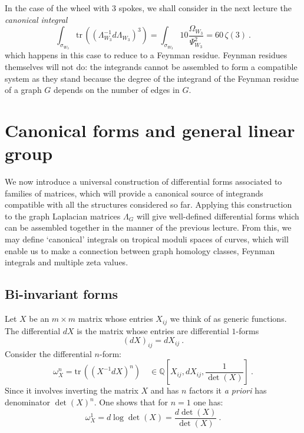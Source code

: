 \documentclass[12pt]{amsart}
\newcommand{\QQ}{{\mathbb Q}}
\newcommand{\tr}{\mathrm{tr}\,}
\theoremstyle{plain}
\newcommand{\0}{\color{blue}{\mathsf{0}}}
\begin{document}
In the case of the wheel with 3 spokes, we shall consider in the next lecture  the \emph{canonical integral}
\[   \int_{\sigma_{W_3}}  \tr \left((\Lambda_{W_3}^{-1}  d\Lambda_{W_3})^3\right) = \int_{\sigma_{W_3}} 10 \frac{\Omega_{W_3}}{\Psi_{W_3}^2} = 60 \, \zeta(3)\ . 
\]
which happens in this case to reduce to a Feynman residue.   Feynman residues themselves will not do: the integrands cannot be assembled to form a compatible system as they stand  because the degree of the integrand of the  Feynman residue  of a graph  $G$ depends on the number of edges in $G$.




\section{Canonical forms and general linear group}


We now introduce a universal construction of differential forms associated to families of matrices, which will provide a canonical source of integrands compatible with all the structures considered so far. Applying this construction to the graph Laplacian matrices $\Lambda_G$ will give well-defined differential forms which can be assembled together in the manner of the previous lecture.   From this, we may  define `canonical' integrals on tropical moduli spaces of curves, which will enable us  to make a connection between graph homology classes, Feynman integrals and multiple zeta values. 



\subsection{Bi-invariant forms}
Let $X$ be an $m \times m$ matrix whose entries $X_{ij}$ we think of as generic functions. The differential $dX$ is the matrix  whose entries are differential $1$-forms
\[ (dX)_{ij} = d X_{ij}\ . \]
Consider the differential $n$-form:
\[ \omega_X^n = \tr  \left(\left( X^{-1} dX \right)^n\right)   \quad \in     \QQ\!\left[X_{ij}, dX_{ij},  \frac{1}{\det(X)}\right]\ . \]
Since it involves inverting the matrix $X$ and has $n$ factors it \emph{a priori} has denominator $\det(X)^n$. 
One shows that for $n=1$ one has:
\[  \omega_X^1 =  d \log \det(X) =   \frac{ d \det(X)}{ \det(X)} \ .\]
\end{document}
